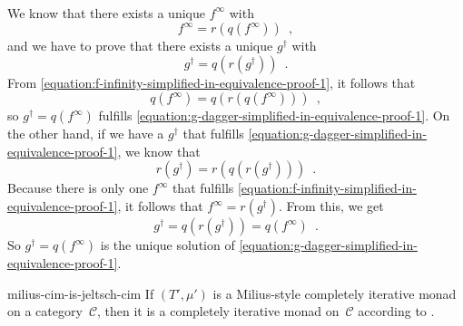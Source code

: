 \documentclass[copyright,creativecommons]{eptcs}
\begin{document}
\begin{extproof}
\begin{align}
\end{align}
We know that there exists a unique $f^∞$ with
\begin{equation}
\label{equation:f-infinity-simplified-in-equivalence-proof-1}
f^∞ = r(q(f^∞))\enspace,
\end{equation}
and we have to prove that there exists a unique $g^†$ with
\begin{equation}
\label{equation:g-dagger-simplified-in-equivalence-proof-1}
g^† = q\left(r\left(g^†\right)\right)\enspace.
\end{equation}
From \eqref{equation:f-infinity-simplified-in-equivalence-proof-1}, it follows
that
\begin{equation}
q(f^∞) = q(r(q(f^∞)))\enspace,
\end{equation}
so $g^† = q(f^∞)$ fulfills
\eqref{equation:g-dagger-simplified-in-equivalence-proof-1}. On the other hand,
if we have a $g^†$ that fulfills
\eqref{equation:g-dagger-simplified-in-equivalence-proof-1}, we know that
\begin{equation}
r\left(g^†\right) = r\left(q\left(r\left(g^†\right)\right)\right)\enspace.
\end{equation}
Because there is only one $f^∞$ that fulfills
\eqref{equation:f-infinity-simplified-in-equivalence-proof-1}, it follows that
$f^∞ = r\left(g^†\right)$. From this, we get
\begin{equation}
g^† = q\left(r\left(g^†\right)\right) = q(f^∞)\enspace.
\end{equation}
So $g^† = q(f^∞)$ is the unique solution of
\eqref{equation:g-dagger-simplified-in-equivalence-proof-1}.
\end{extproof}

\begin{exttheorem}{milius-cim-is-jeltsch-cim}
If $(T′, μ′)$ is a Milius-style completely iterative monad on a category~$𝒞$,
then it is a completely iterative monad on~$𝒞$ according to
.
\end{exttheorem}
\end{document}
